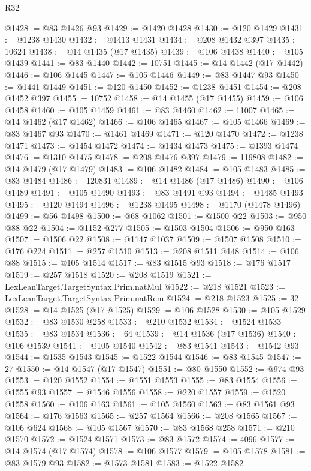 \begin{lexlean}{R32}
\begin{coremodule}
@1428 := @83 @1426 @93
@1429 := @1420 @1428
@1430 := @120 @1429
@1431 := @1238 @1430
@1432 := @1413 @1431
@1434 := @208 @1432 @397
@1435 := 10624
@1438 := @14 @1435 (@17 @1435)
@1439 := @106 @1438
@1440 := @105 @1439
@1441 := @83 @1440
@1442 := 10751
@1445 := @14 @1442 (@17 @1442)
@1446 := @106 @1445
@1447 := @105 @1446
@1449 := @83 @1447 @93
@1450 := @1441 @1449
@1451 := @120 @1450
@1452 := @1238 @1451
@1454 := @208 @1452 @397
@1455 := 10752
@1458 := @14 @1455 (@17 @1455)
@1459 := @106 @1458
@1460 := @105 @1459
@1461 := @83 @1460
@1462 := 11007
@1465 := @14 @1462 (@17 @1462)
@1466 := @106 @1465
@1467 := @105 @1466
@1469 := @83 @1467 @93
@1470 := @1461 @1469
@1471 := @120 @1470
@1472 := @1238 @1471
@1473 := @1454 @1472
@1474 := @1434 @1473
@1475 := @1393 @1474
@1476 := @1310 @1475
@1478 := @208 @1476 @397
@1479 := 119808
@1482 := @14 @1479 (@17 @1479)
@1483 := @106 @1482
@1484 := @105 @1483
@1485 := @83 @1484
@1486 := 120831
@1489 := @14 @1486 (@17 @1486)
@1490 := @106 @1489
@1491 := @105 @1490
@1493 := @83 @1491 @93
@1494 := @1485 @1493
@1495 := @120 @1494
@1496 := @1238 @1495
@1498 := @1170 (@1478 @1496)
@1499 := @56 @1498
@1500 := @68 @1062
@1501 := @1500 @22
@1503 := @950 @88 @22
@1504 := @1152 @277
@1505 := @1503 @1504
@1506 := @950 @163
@1507 := @1506 @22
@1508 := @1147 @1037
@1509 := @1507 @1508
@1510 := @176 @224
@1511 := @257 @1510
@1513 := @208 @1511 @148
@1514 := @106 @88
@1515 := @105 @1514
@1517 := @83 @1515 @93
@1518 := @176 @1517
@1519 := @257 @1518
@1520 := @208 @1519
@1521 := LexLeanTarget.TargetSyntax.Prim.natMul
@1522 := @218 @1521
@1523 := LexLeanTarget.TargetSyntax.Prim.natRem
@1524 := @218 @1523
@1525 := 32
@1528 := @14 @1525 (@17 @1525)
@1529 := @106 @1528
@1530 := @105 @1529
@1532 := @83 @1530 @258
@1533 := @210 @1532
@1534 := @1524 @1533
@1535 := @83 @1534
@1536 := 64
@1539 := @14 @1536 (@17 @1536)
@1540 := @106 @1539
@1541 := @105 @1540
@1542 := @83 @1541
@1543 := @1542 @93
@1544 := @1535 @1543
@1545 := @1522 @1544
@1546 := @83 @1545
@1547 := 27
@1550 := @14 @1547 (@17 @1547)
@1551 := @80 @1550
@1552 := @974 @93
@1553 := @120 @1552
@1554 := @1551 @1553
@1555 := @83 @1554
@1556 := @1555 @93
@1557 := @1546 @1556
@1558 := @220 @1557
@1559 := @1520 @1558
@1560 := @106 @163
@1561 := @105 @1560
@1563 := @83 @1561 @93
@1564 := @176 @1563
@1565 := @257 @1564
@1566 := @208 @1565
@1567 := @106 @624
@1568 := @105 @1567
@1570 := @83 @1568 @258
@1571 := @210 @1570
@1572 := @1524 @1571
@1573 := @83 @1572
@1574 := 4096
@1577 := @14 @1574 (@17 @1574)
@1578 := @106 @1577
@1579 := @105 @1578
@1581 := @83 @1579 @93
@1582 := @1573 @1581
@1583 := @1522 @1582

\end{coremodule}
\end{lexlean}
